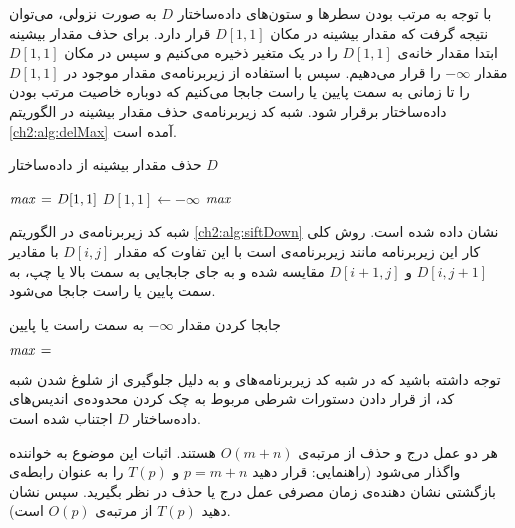 با توجه به مرتب بودن سطرها و ستون‌های داده‌ساختار {$D$} به صورت نزولی، می‌توان نتیجه گرفت که مقدار بیشینه در مکان {$D[1,1]$} قرار دارد. برای حذف مقدار بیشینه ابتدا مقدار خانه‌ی {$D[1,1]$} را در یک متغیر ذخیره می‌کنیم و سپس در مکان {$D[1,1]$} مقدار  {$-\infty$} را قرار می‌دهیم. سپس با استفاده از زیربرنامه‌ی {} مقدار موجود در {$D[1,1]$} را تا زمانی به سمت پایین یا راست جابجا می‌کنیم که دوباره خاصیت مرتب بودن داده‌ساختار برقرار شود. شبه کد زیربرنامه‌ی حذف مقدار بیشینه در الگوریتم {\ref{ch2:alg:delMax}} آمده است.
\begin{algorithm}
\caption{حذف مقدار بیشینه از داده‌ساختار {$D$}}\label{ch2:alg:delMax}
\begin{latin}
\begin{algorithmic}[1]
		\State	$\mathit{max} \mathrel{\hspace{1pt}=\hspace{1pt}} D[1,1]$
		\State	$D[1,1] \gets -\infty$
		\State	{}
		\State	\Return $\mathit{max}$	
\EndProcedure
\end{algorithmic}
\end{latin}
\end{algorithm}

شبه کد زیربرنامه‌ی {} در الگوریتم {\ref{ch2:alg:siftDown}} نشان داده شده است.  روش کلی کار این زیربرنامه‌ مانند زیربرنامه‌ی {} است با این تفاوت که مقدار {$D[i,j]$} با مقادیر {$D[i,j+1]$} و {$D[i+1,j]$} مقایسه شده و به جای جابجایی به سمت بالا یا چپ، به سمت پایین یا راست جابجا می‌شود.
\begin{algorithm}
\caption{جابجا کردن مقدار {$-\infty$} به سمت راست یا پایین}\label{ch2:alg:siftDown}
\begin{latin}
\begin{algorithmic}[1]
		\State	$\mathit{max} \mathrel{\hspace{1pt}=\hspace{1pt}}$ 
				\State	\Return
				\State	{}
				\State	{}
		\Else
				\State	{}
				\State	{}
		\EndIf
\EndProcedure
\end{algorithmic}
\end{latin}
\end{algorithm}

توجه داشته باشید که در شبه کد زیربرنامه‌های {} و {} به دلیل جلوگیری از شلوغ شدن شبه کد، از قرار دادن دستورات شرطی مربوط به چک کردن محدوده‌ی اندیس‌ها‌ی داده‌ساختار {$D$} اجتناب شده است.

هر دو عمل درج و حذف از مرتبه‌ی {$O(m+n)$} هستند. اثبات این موضوع به خواننده واگذار می‌شود (راهنمایی: قرار دهید {$p=m+n$} و {$T(p)$} را به عنوان رابطه‌ی بازگشتی نشان دهنده‌ی زمان مصرفی عمل درج یا حذف در نظر بگیرید. سپس نشان دهید {$T(p)$} از مرتبه‌ی {$O(p)$} است).

